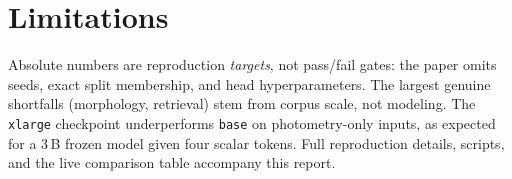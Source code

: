 \documentclass[11pt,letterpaper]{article}
\begin{document}
\section{Limitations}
Absolute numbers are reproduction \emph{targets}, not pass/fail gates: the paper
omits seeds, exact split membership, and head hyperparameters. The largest
genuine shortfalls (morphology, retrieval) stem from corpus scale, not modeling.
The \texttt{xlarge} checkpoint underperforms \texttt{base} on photometry-only
inputs, as expected for a 3\,B frozen model given four scalar tokens. Full
reproduction details, scripts, and the live comparison table accompany this
report.



\end{document}
